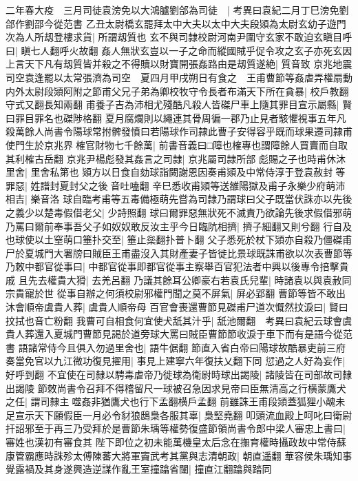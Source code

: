 二年春大疫　三月司徒袁滂免以大鴻臚劉郃為司徒　|{
	考異曰袁紀二月丁巳滂免劉郃作劉邵今從范書}
乙丑太尉橋玄罷拜太中大夫以太中大夫段熲為太尉玄幼子遊門次為人所刼登樓求貨|{
	所謂刼質也}
玄不與司隸校尉河南尹圍守玄家不敢迫玄瞋目呼曰|{
	瞋七人翻呼火故翻}
姦人無狀玄豈以一子之命而縱國賊乎促令攻之玄子亦死玄因上言天下凡有刼質皆并殺之不得贖以財寶開張姦路由是刼質遂絶|{
	質音致}
京兆地震　司空袁逢罷以太常張濟為司空　夏四月甲戌朔日有食之　王甫曹節等姦虐弄權扇動内外太尉段熲阿附之節甫父兄子弟為卿校牧守令長者布滿天下所在貪暴|{
	校戶教翻守式又翻長知兩翻}
甫養子吉為沛相尤殘酷凡殺人皆磔尸車上隨其罪目宣示屬縣|{
	賢曰罪目罪名也磔陟格翻}
夏月腐爛則以繩連其骨周徧一郡乃止見者駭懼視事五年凡殺萬餘人尚書令陽球常拊髀發憤曰若陽球作司隷此曹子安得容乎既而球果遷司隷甫使門生於京兆界榷官財物七千餘萬|{
	前書音義曰□障也榷專也謂障餘人買賣而自取其利榷古岳翻}
京兆尹楊彪發其姦言之司隷|{
	京兆屬司隷所部}
彪賜之子也時甫休沐里舍|{
	里舍私第也}
熲方以日食自劾球詣闕謝恩因奏甫熲及中常侍淳于登袁赦封等罪惡|{
	姓譜封夏封父之後音吐嗑翻}
辛巳悉收甫熲等送雒陽獄及甫子永樂少府萌沛相吉|{
	樂音洛}
球自臨考甫等五毒備極萌先嘗為司隸乃謂球曰父子既當伏誅亦以先後之義少以楚毒假借老父|{
	少詩照翻}
球曰爾罪惡無狀死不滅責乃欲論先後求假借邪萌乃罵曰爾前奉事吾父子如奴奴敢反汝主乎今日臨阬相擠|{
	擠子細翻又則兮翻}
行自及也球使以土窒萌口箠扑交至|{
	箠止橤翻扑普卜翻}
父子悉死於杖下熲亦自殺乃僵磔甫尸於夏城門大署牓曰賊臣王甫盡沒入其財產妻子皆徙比景球既誅甫欲以次表曹節等乃敇中都官從事曰|{
	中都官從事即都官從事主察舉百官犯法者中興以後專令掊擊貴戚}
且先去權貴大猾|{
	去羌呂翻}
乃議其餘耳公卿豪右若袁氏兒輩|{
	時諸袁以與袁赦同宗貴寵於世}
從事自辦之何須校尉邪權門聞之莫不屏氣|{
	屏必郢翻}
曹節等皆不敢出沐會順帝虞貴人葬|{
	虞貴人順帝母}
百官會喪還曹節見磔甫尸道次慨然抆淚曰|{
	賢曰抆拭也音亡粉翻}
我曹可自相食何宜使犬舐其汁乎|{
	舐池爾翻　考異曰袁紀云球會虞貴人葬還入夏城門曹節見謁於道旁球大罵曰賊臣曹節節收淚于車下而有是語今從范書}
語諸常侍今且俱入勿過里舍也|{
	語牛倨翻}
節直入省白帝曰陽球故酷暴吏前三府奏當免官以九江微功復見擢用|{
	事見上建寧六年復扶乂翻下同}
愆過之人好為妄作|{
	好呼到翻}
不宜使在司隸以騁毒虐帝乃徙球為衛尉時球出謁陵|{
	諸陵皆在司部故司隸出謁陵}
節敇尚書令召拜不得稽留尺一球被召急因求見帝曰臣無清高之行横蒙鷹犬之任|{
	謂司隸主噬姦非猶鷹犬也行下孟翻横戶孟翻}
前雖誅王甫段熲蓋狐狸小醜未足宣示天下願假臣一月必令豺狼鴟梟各服其辜|{
	梟堅堯翻}
叩頭流血殿上呵叱曰衛尉扞詔邪至于再三乃受拜於是曹節朱瑀等權勢復盛節領尚書令郎中梁人審忠上書曰|{
	審姓也漢初有審食其}
陛下即位之初未能萬機皇太后念在撫育權時攝政故中常侍蘇康管霸應時誅殄太傅陳蕃大將軍竇武考其黨與志清朝政|{
	朝直遥翻}
華容侯朱瑀知事覺露禍及其身遂興造逆謀作亂王室撞蹹省闥|{
	撞直江翻蹹與踏同}
